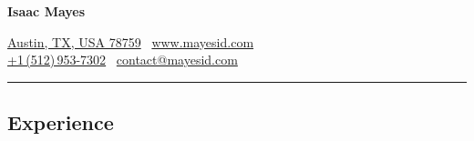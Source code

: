 \documentclass[9pt,letterpaper]{extarticle}
\newenvironment{indentsection}[1]
{\begin{list}{}%
	{\setlength{\leftmargin}{#1}}
	\item[]%
}
{\end{list}}
\begin{document}
\sffamily

\begin{center}
{\Huge \textbf{Isaac Mayes}}

\href{https://www.google.com/maps/place/Austin,+TX+78759/}{Austin, TX, USA 78759} \textbullet\ \href{http://www.mayesid.com}{www.mayesid.com}
\\
\href{tel:+15129537302}{+1\,(512)\,953-7302} \textbullet\ \href{mailto:contact@mayesid.com}{contact@mayesid.com}
\end{center}

%

\hrule
\vspace{-0.2em}
\subsection*{Experience}
\end{document}
